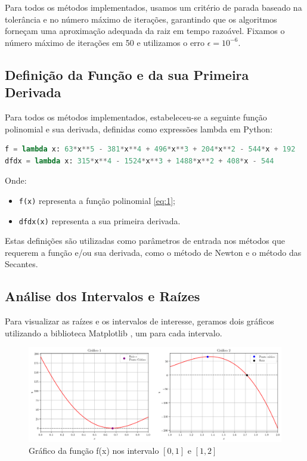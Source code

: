 \documentclass{article}
\begin{document}
Para todos os métodos implementados, usamos um critério de parada baseado na tolerância e no número máximo de iterações, garantindo que os algoritmos forneçam uma aproximação adequada da raiz em tempo razoável. Fixamos o número máximo de iterações em 50 e utilizamos o erro $\epsilon=10^{-6}$.

\subsection{Defini\c{c}\~{a}o da Fun\c{c}\~{a}o e da sua Primeira Derivada}

Para todos os m\'{e}todos implementados, estabeleceu-se a seguinte fun\c{c}\~{a}o polinomial e sua derivada, definidas como express\~{o}es lambda em Python:

\begin{lstlisting}[language=Python]
f = lambda x: 63*x**5 - 381*x**4 + 496*x**3 + 204*x**2 - 544*x + 192
dfdx = lambda x: 315*x**4 - 1524*x**3 + 1488*x**2 + 408*x - 544
\end{lstlisting}

Onde:
\begin{itemize}
    \item \texttt{f(x)} representa a fun\c{c}\~{a}o polinomial \eqref{eq:1};
    \item \texttt{dfdx(x)} representa a sua primeira derivada.
\end{itemize}

Estas defini\c{c}\~{o}es s\~{a}o utilizadas como par\^{a}metros de entrada nos m\'{e}todos que requerem a fun\c{c}\~{a}o e/ou sua derivada, como o m\'{e}todo de Newton e o m\'{e}todo das Secantes.

\subsection{An\'{a}lise dos Intervalos e Ra\'{i}zes}

Para visualizar as ra\'{i}zes e os intervalos de interesse, geramos dois gr\'{a}ficos utilizando a biblioteca Matplotlib \cite{matplotlib}, um para cada intervalo.

\begin{figure}[h]
\centering
\includegraphics[width=\textwidth, keepaspectratio]{output.png}
\caption{Gr\'{a}fico da fun\c{c}\~{a}o f(x) nos intervalo $[0,1]$ e $[1,2]$}
\label{fig:funcao_grafico}
\end{figure}
\end{document}
